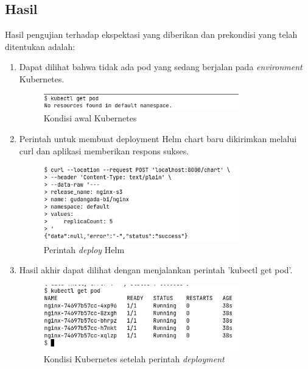 \subsection{Hasil}
Hasil pengujian terhadap ekspektasi yang diberikan dan prekondisi yang telah ditentukan adalah:
\begin{enumerate}
    \item Dapat dilihat bahwa tidak ada pod yang sedang berjalan pada \textit{environment} Kubernetes.
    \begin{figure}
    	\centering
    	\includegraphics[width=0.8\textwidth]{pics/5.1.GetPod.png}
    	\caption{Kondisi awal Kubernetes}
    	\label{fig:getPod}
    \end{figure}
    \item Perintah untuk membuat deployment Helm chart baru dikirimkan melalui curl dan aplikasi memberikan respons sukses.
    \begin{figure}
    	\centering
    	\includegraphics[width=0.8\textwidth]{pics/5.1.Curl.png}
    	\caption{Perintah \textit{deploy} Helm}
    	\label{fig:deployHelm}
    \end{figure}    
    \item Hasil akhir dapat dilihat dengan menjalankan perintah 'kubectl get pod'.
    \begin{figure}
    	\centering
    	\includegraphics[width=0.8\textwidth]{pics/5.1.FinalGetPod.png}
    	\caption{Kondisi Kubernetes setelah perintah \textit{deployment}}
    	\label{fig:getPodFinal}
    \end{figure}
\end{enumerate}


